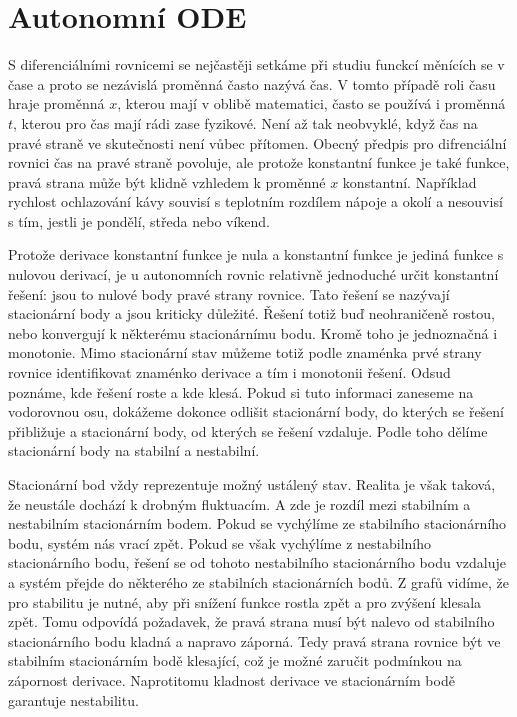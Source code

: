 \documentclass[12pt]{article}
\begin{document}
\section*{Autonomní ODE}

S diferenciálními rovnicemi se nejčastěji setkáme při studiu funckcí měnících se v čase a proto se nezávislá proměnná často nazývá čas. V tomto případě roli času hraje proměnná $x$, kterou mají v oblibě matematici, často se používá i proměnná $t$, kterou pro čas mají rádi zase fyzikové. Není až tak neobvyklé, když čas na pravé straně ve skutečnosti není vůbec přítomen. Obecný předpis pro difrenciální rovnici čas na pravé straně povoluje, ale protože konstantní funkce je také funkce, pravá strana může být klidně vzhledem k proměnné $x$ konstantní. Například rychlost ochlazování kávy souvisí s teplotním rozdílem nápoje a okolí a nesouvisí s tím, jestli je pondělí, středa nebo víkend.

Protože derivace konstantní funkce je nula a konstantní funkce je jediná funkce s nulovou derivací, je u autonomních rovnic relativně jednoduché určit konstantní řešení: jsou to nulové body pravé strany rovnice. Tato řešení se nazývají stacionární body a jsou kriticky důležité. Řešení totiž buď neohraničeně rostou, nebo konvergují k některému stacionárnímu bodu. Kromě toho je jednoznačná i monotonie. Mimo stacionární stav můžeme totiž podle znaménka prvé strany rovnice identifikovat znaménko derivace a tím i monotonii řešení. Odsud poznáme, kde řešení roste a kde klesá. Pokud si tuto informaci zaneseme na vodorovnou osu, dokážeme dokonce odlišit stacionární body, do kterých se řešení přibližuje a stacionární body, od kterých se řešení vzdaluje. Podle toho dělíme stacionární body na stabilní a nestabilní.

Stacionární bod vždy reprezentuje možný ustálený stav. Realita je však taková, že neustále dochází k drobným fluktuacím. A zde je rozdíl mezi stabilním a nestabilním stacionárním bodem. Pokud se vychýlíme ze stabilního stacionárního bodu, systém nás vrací zpět. Pokud se však vychýlíme z nestabilního stacionárního bodu, řešení se od tohoto nestabilního stacionárního bodu vzdaluje a systém přejde do některého ze stabilních stacionárních bodů. Z grafů vidíme, že pro stabilitu je nutné, aby při snížení funkce rostla zpět a pro zvýšení klesala zpět. Tomu odpovídá požadavek, že pravá strana musí být nalevo od stabilního stacionárního bodu kladná a napravo záporná. Tedy pravá strana rovnice být ve stabilním stacionárním bodě klesající, což je možné zaručit podmínkou na zápornost derivace. Naprotitomu kladnost derivace ve stacionárním bodě garantuje nestabilitu. 
\end{document}
